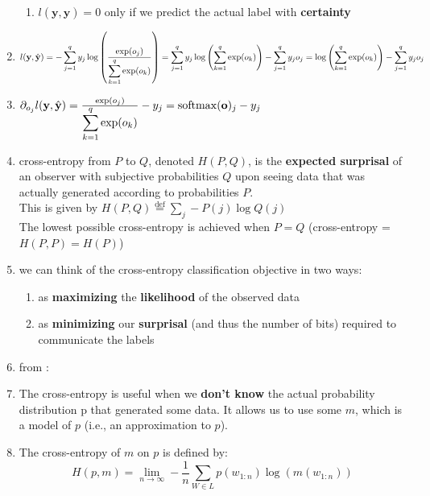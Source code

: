 \begin{enumerate}[itemsep=0.2cm]
\begin{enumerate}
        \item $l(\mathbf{y}, \hat{\mathbf{y}}) = 0$ only if we predict the actual label with \textbf{certainty}

    \end{enumerate}

    \item $
        l(\mathbf{y}, \hat{\mathbf{y}}) 
        = - \displaystyle\sum_{j=1}^q y_j \log \left(\frac{\exp(o_j)}{\displaystyle\sum_{k=1}^q \exp(o_k)}\right)
        = \displaystyle\sum_{j=1}^q y_j \log \left(\displaystyle\sum_{k=1}^q \exp(o_k)\right) - \displaystyle\sum_{j=1}^q y_j o_j
        = \log \left(\displaystyle\sum_{k=1}^q \exp(o_k)\right) - \displaystyle\sum_{j=1}^q y_j o_j
    $

    \item $
        \partial_{o_j} l(\mathbf{y}, \hat{\mathbf{y}}) 
        = \frac{\exp(o_j)}{\displaystyle\sum_{k=1}^q \exp(o_k)} - y_j 
        = \mathrm{softmax}(\mathbf{o})_j - y_j
    $

    \item cross-entropy from $P$ to $Q$, denoted $H(P, Q)$, is the \textbf{expected surprisal} of an observer with subjective probabilities $Q$ upon seeing data that was actually generated according to probabilities $P$.\\
    This is given by $H(P, Q) \stackrel{\textrm{def}}{=} \sum_j - P(j) \log Q(j)$\\
    The lowest possible cross-entropy is achieved when $P=Q$ (cross-entropy = $H(P,P)=H(P)$)


    \item we can think of the cross-entropy classification objective in two ways: 
    \begin{enumerate}
        \item as \textbf{maximizing} the \textbf{likelihood} of the observed data
        
        \item as \textbf{minimizing} our \textbf{surprisal} (and thus the number of bits) required to communicate the labels
    \end{enumerate}

    \item[] from \cite{nlp-1}:

    \item The cross-entropy is useful when we \textbf{don’t know} the actual probability distribution p that generated some data. It allows us to use some $m$, which is a model of $p$ (i.e., an approximation to $p$). 
    
    \item The cross-entropy of $m$ on $p$ is defined by:
    \[
        H(p,m) = \lim_{n \rightarrow \infty} - \dfrac{1}{n}\sum_{W\in L} p(w_{1:n})\log(m(w_{1:n}))
    \]


\end{enumerate}
